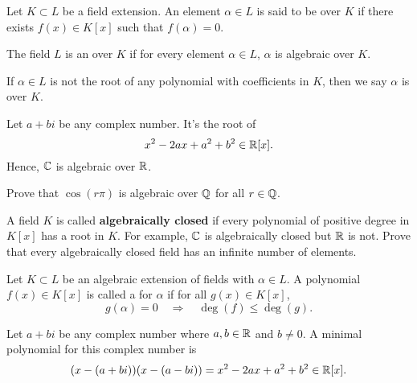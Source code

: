 \documentclass{ximera}
\begin{document}
\begin{definition}
  Let $K\subset L$ be a field extension. An element $\alpha\in L$ is
  said to be  over $K$ if there exists $f(x) \in K[x]$
  such that $f(\alpha) = 0$.

  
  The field $L$ is an  over $K$ if for every
  element $\alpha\in L$, $\alpha$ is algebraic over $K$.


  
  If $\alpha\in L$ is not the root of any polynomial with coefficients
  in $K$, then we say $\alpha$ is  over $K$.
\end{definition}

\begin{example}
  Let $a+ bi$ be any complex number. It's the root of
  \[
  x^2 -2ax + a^2 + b^2 \in \mathbb R[x].
  \]
  Hence, $\mathbb C$ is algebraic over $\mathbb R$.
\end{example}

\begin{exercise}
  Prove that $\cos(r\pi)$ is algebraic over $\mathbb Q$ for all $r\in\mathbb Q$.
\end{exercise}

\begin{exercise}
  A field $K$ is called \textbf{algebraically closed} if every
  polynomial of positive degree in $K[x]$ has a root in $K$. For
  example, $\mathbb C$ is algebraically closed but $\mathbb R$ is not. Prove that
  every algebraically closed field has an infinite number of elements.
\end{exercise}


\begin{definition}
  Let $K\subset L$ be an algebraic extension of fields with
  $\alpha\in L$. A polynomial $f(x)\in K[x]$ is called a  for $\alpha$ if for all $g(x)\in K[x]$,
  \[
  g(\alpha) = 0 \quad\Rightarrow\quad \deg(f) \le \deg(g).
  \]
\end{definition}

\begin{example}
  Let $a+bi$ be any complex number where $a,b\in\mathbb R$ and $b\ne 0$. A
  minimal polynomial for this complex number is
  \[
  (x-(a+bi))(x-(a-bi)) = x^2 -2ax +a^2 + b^2\in\mathbb R[x].
  \]
\end{example}
\end{document}
